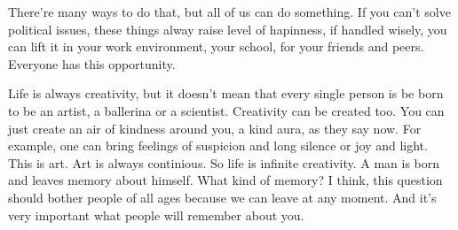 There're many ways to do that, but all of us can do something. If you can't solve political issues, these things alway raise level of hapinness, if handled wisely, you can lift it in your work environment, your school, for your friends and peers. Everyone has this opportunity.

Life is always creativity, but it doesn't mean that every single person is be born to be an artist, a ballerina or a scientist. Creativity can be created too. You can just create an air of kindness around you, a kind aura, as they say now. For example, one can bring feelings of suspicion and long silence or joy and light. This is art. Art is always continious. So life is infinite creativity. A man is born and leaves memory about himself. What kind of memory? I think, this question should bother people of all ages because we can leave at any moment. And it's very important what people will remember about you.